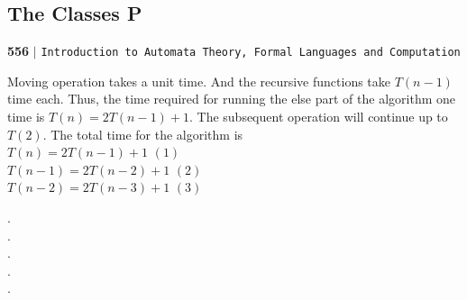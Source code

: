 \documentclass[9pt]{beamer}
\begin{document}
\begin{frame}
\section*{The Classes P}
\begin{flushleft}
    \textbf{556}\hspace*{0.1cm} \textbf{$|$} \hspace*{0.1cm} \texttt{Introduction to Automata Theory, Formal Languages and Computation}
  \end{flushleft}

\vspace*{0.5cm}
\hspace*{0.5cm} Moving operation takes a unit time. And the recursive functions take $T(n - 1)$ time each. Thus, the
time required for running the else part of the algorithm one time is $T(n) = 2T(n - 1) + 1 $. The subsequent
operation will continue up to $T(2)$. The total time for the algorithm is\\


\hspace*{4cm} $T(n) = 2T(n - 1) + 1$   \hspace*{3cm} $(1)$ \\
\hspace*{3.5cm} $T(n - 1) = 2T(n - 2) + 1$   \hspace*{3cm} $(2)$ \\
\hspace*{3.5cm} $T(n - 2) = 2T(n - 3) + 1$   \hspace*{3cm} $(3)$ \\
\begin{center}
  . \\
  . \\
  . \\
  . \\
  . \\
\end{center}
\end{frame}
\end{document}
